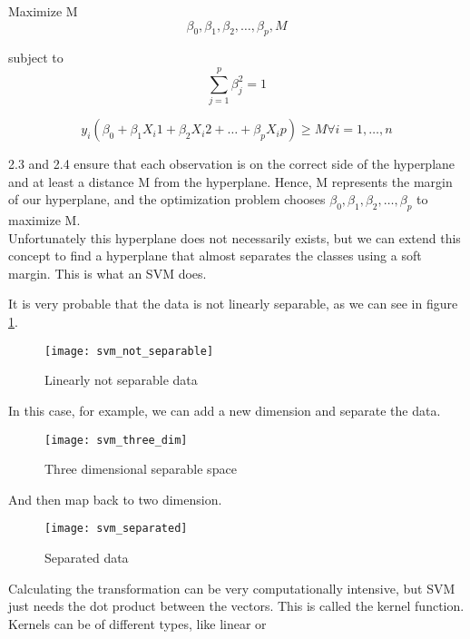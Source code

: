 Maximize M
\begin{equation}
\beta_0, \beta_1, \beta_2, \dots, \beta_p, M
\end{equation}

subject to
\begin{equation}
\sum_{j=1}^{p}\beta^2_j = 1
\end{equation}

\begin{equation}
y_i(\beta_0 + \beta_1 X_i1 + \beta_2 X_i2 + \dots + \beta_p X_ip) \ge M \forall i = 1, \dots, n
\end{equation}

2.3 and 2.4 ensure that each observation is on the correct side of the hyperplane and at least a distance M from the hyperplane. Hence, M represents the margin of our hyperplane, and the optimization problem chooses $\beta_0, \beta_1, \beta_2, \dots, \beta_p$ to maximize M. \\
Unfortunately this hyperplane does not necessarily exists, but we can extend this concept to find a hyperplane that almost separates the classes using a soft margin. This is what an SVM does.

It is very probable that the data is not linearly separable, as we can see in figure \ref{fig:svmnotsep}.
\begin{figure}[H]
	\centering
	\texttt{[image: svm\_not\_separable]}
	\caption{Linearly not separable data \cite{svm_monkeylearn}}
	\label{fig:svmnotsep}
\end{figure}

In this case, for example, we can add a new dimension and separate the data. 
\begin{figure}[H]
	\centering
	\texttt{[image: svm\_three\_dim]}
	\caption{Three dimensional separable space \cite{svm_monkeylearn}}
\end{figure} 

And then map back to two dimension.
\begin{figure}[H]
	\centering
	\texttt{[image: svm\_separated]}
	\caption{Separated data \cite{svm_monkeylearn}}
\end{figure}



Calculating the transformation can be very computationally intensive, but SVM just needs the dot product between the vectors. This is called the kernel function. Kernels can be of different types, like linear or 
